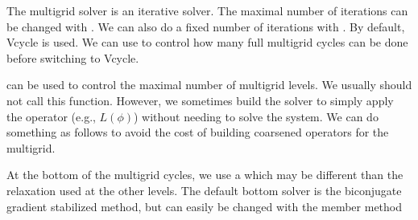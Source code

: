 \documentclass[letterpaper,10pt,english]{sphinxmanual}
\begin{document}
\sphinxAtStartPar
The multigrid solver is an iterative solver.  The maximal number of
iterations can be changed with .  We can
also do a fixed number of iterations with
.  By default, V\sphinxhyphen{}cycle is used.  We can
use  to control how many full multigrid
cycles can be done before switching to V\sphinxhyphen{}cycle.

\sphinxAtStartPar
{} can be used to control the
maximal number of multigrid levels.  We usually should not call this
function.  However, we sometimes build the solver to simply apply the
operator (e.g., \(L(\phi)\)) without needing to solve the system.
We can do something as follows to avoid the cost of building coarsened
operators for the multigrid.

\begin{sphinxVerbatim}[commandchars=\\\{\}]
    
 
   
\end{sphinxVerbatim}

\sphinxAtStartPar
At the bottom of the multigrid cycles, we use a  which may be
different than the relaxation used at the other levels. The default bottom solver is the
biconjugate gradient stabilized method, but can easily be changed with the  member method
\end{document}
